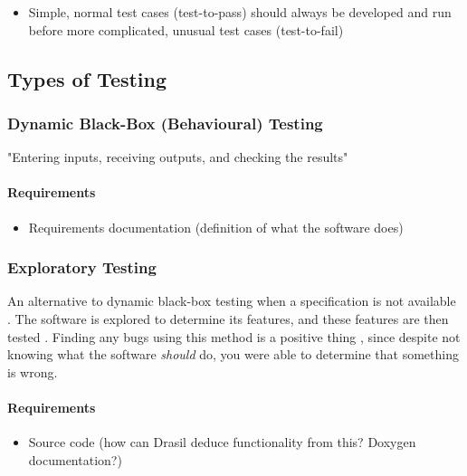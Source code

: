 \begin{itemize}
      \item Simple, normal test cases (test-to-pass) should always be developed
            and run before more complicated, unusual test cases (test-to-fail)
            \cite[p.~66]{patton_software_2006}
\end{itemize}

\subsection{Types of Testing}

\subsubsection{Dynamic Black-Box (Behavioural) Testing
      \cite[p.~64-65]{patton_software_2006}}

"Entering inputs, receiving outputs, and checking the results"
\cite[p.~64]{patton_software_2006}

\paragraph{Requirements}
\begin{itemize}
      \item Requirements documentation (definition of what the software does)
            \cite[p.~64]{patton_software_2006}
\end{itemize}

\subsubsection{Exploratory Testing \cite[p.~65]{patton_software_2006}}

An alternative to dynamic black-box testing when a specification is not
available \cite[p.~65]{patton_software_2006}. The software is explored to
determine its features, and these features are then tested
\cite[p.~65]{patton_software_2006}. Finding any bugs using this method is a
positive thing \cite[p.~65]{patton_software_2006}, since despite not knowing
what the software \emph{should} do, you were able to determine that something
is wrong.

\paragraph{Requirements}
\begin{itemize}
      \item Source code \cite[p.~65]{patton_software_2006} (how can Drasil
            deduce functionality from this? Doxygen documentation?)
\end{itemize}

